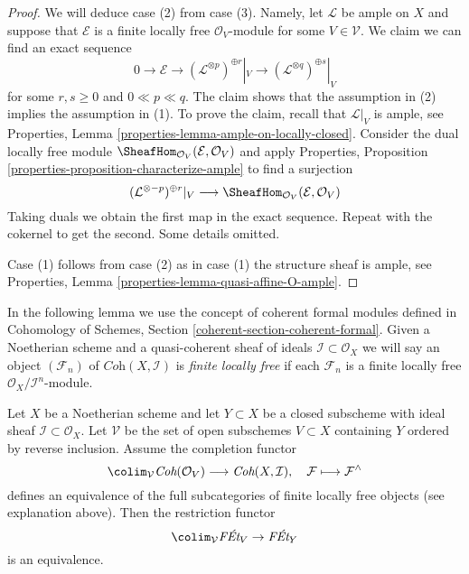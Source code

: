 \begin{proof}
\medskip\noindent
We will deduce case (2) from case (3). Namely, let $\mathcal{L}$ be ample
on $X$ and suppose that $\mathcal{E}$ is a
finite locally free $\mathcal{O}_V$-module
for some $V \in \mathcal{V}$.
We claim we can find an exact sequence
$$
0 \to \mathcal{E} \to
(\mathcal{L}^{\otimes p})^{\oplus r}|_{V} \to
(\mathcal{L}^{\otimes q})^{\oplus s}|_{V}
$$
for some $r, s \geq 0$ and $0 \ll p \ll q$.
The claim shows that the assumption in (2) implies the assumption in (1).
To prove the claim, recall that $\mathcal{L}|_V$ is ample, see
Properties, Lemma \ref{properties-lemma-ample-on-locally-closed}.
Consider the dual locally free module
$\SheafHom_{\mathcal{O}_V}(\mathcal{E}, \mathcal{O}_V)$
and apply
Properties, Proposition \ref{properties-proposition-characterize-ample}
to find a surjection
$$
(\mathcal{L}^{\otimes -p})^{\oplus r}|_V \longrightarrow
\SheafHom_{\mathcal{O}_V}(\mathcal{E}, \mathcal{O}_V)
$$
Taking duals we obtain the first map in the exact sequence.
Repeat with the cokernel to get the second. Some details omitted.

\medskip\noindent
Case (1) follows from case (2) as in case (1) the structure
sheaf is ample, see 
Properties, Lemma \ref{properties-lemma-quasi-affine-O-ample}.
\end{proof}

\noindent
In the following lemma we use the concept of coherent formal modules
defined in
Cohomology of Schemes, Section \ref{coherent-section-coherent-formal}.
Given a Noetherian scheme and a quasi-coherent sheaf of ideals
$\mathcal{I} \subset \mathcal{O}_X$ we will say
an object $(\mathcal{F}_n)$ of $\textit{Coh}(X, \mathcal{I})$
is {\it finite locally free} if each $\mathcal{F}_n$ is a finite
locally free $\mathcal{O}_X/\mathcal{I}^n$-module.

\begin{lemma}
\label{lemma-restriction-equivalence-general}
Let $X$ be a Noetherian scheme and let $Y \subset X$ be a closed subscheme
with ideal sheaf $\mathcal{I} \subset \mathcal{O}_X$.
Let $\mathcal{V}$ be the set of open subschemes $V \subset X$ containing $Y$
ordered by reverse inclusion. Assume the completion functor
$$
\colim_\mathcal{V} \textit{Coh}(\mathcal{O}_V)
\longrightarrow
\textit{Coh}(X, \mathcal{I}),
\quad
\mathcal{F} \longmapsto \mathcal{F}^\wedge
$$
defines an equivalence of the full subcategories of
finite locally free objects (see explanation above).
Then the restriction functor
$$
\colim_\mathcal{V} \textit{F\'Et}_V \to \textit{F\'Et}_Y
$$
is an equivalence.
\end{lemma}

